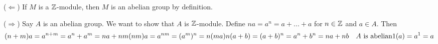($\Leftarrow$) If $M$ is a $\Bbb Z$-module, then $M$ is an abelian group by definition.

($\Rightarrow$) Say $A$ is an abelian group. We want to show that $A$ is $\Bbb Z$-module. Define $na = a^n = a + ... +a$ for $n\in \Bbb Z$ and $a \in A$. Then 
\[
(n+m)a = a^{n+m}=a^n+a^m= na + nm \\
(nm)a = a^{nm} = (a^{m})^n = n(ma) \\
n(a+b) = (a+b)^n = a^n + b^n = na + nb \quad \text{$A$ is abelian} \\
1(a) = a^1 = a
\]
